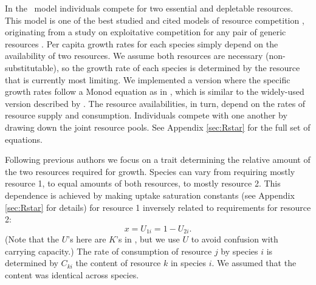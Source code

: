 \documentclass[a4paper,11pt]{article}
\begin{document}
In the \Rstar\ model individuals compete for two essential and
depletable resources. This model is one of the best studied and cited
models of resource competition \citep{Tilman-1977, Tilman-1982,
  Huisman-2001}, originating from a study on exploitative competition
for any pair of generic resources \citep{Leon-1975}. Per capita growth rates for each species simply depend on the availability of two resources.  We assume both
resources are necessary (non-substitutable), so the growth rate
of each species is determined by the resource that is currently most
limiting.  We implemented a version where the specific growth rates
follow a Monod equation as in \citet{Huisman-2001}, which is
similar to the widely-used version described by \citet{Tilman-1977,
  Tilman-1982}.
The resource availabilities, in turn, depend on the rates of resource
supply and consumption. Individuals compete with one another by
drawing down the joint resource pools. See Appendix \ref{sec:Rstar}
for the full set of equations.

Following previous authors \citep{Tilman-1985, Schreiber-2003,
  Fox-2008} we focus on a trait determining the relative amount of the
two resources required for growth. Species can vary from requiring
mostly resource 1, to equal amounts of both resources, to mostly
resource 2. This dependence is achieved by making uptake saturation
constants (see Appendix \ref{sec:Rstar} for details) for resource 1
inversely related to requirements for resource 2:
\begin{equation}
\label{eq:R3}
x = U_{1i} = 1 - U_{2i}.
\end{equation}
(Note that the $U$'s here are $K$'s in \citet{Huisman-2001}, but we
use $U$ to avoid confusion with carrying capacity.)  The rate of
consumption of resource $j$ by species $i$ is determined by $C_{ki}$
the content of resource $k$ in species $i$. We assumed that the
content was identical across species.


%
\end{document}
